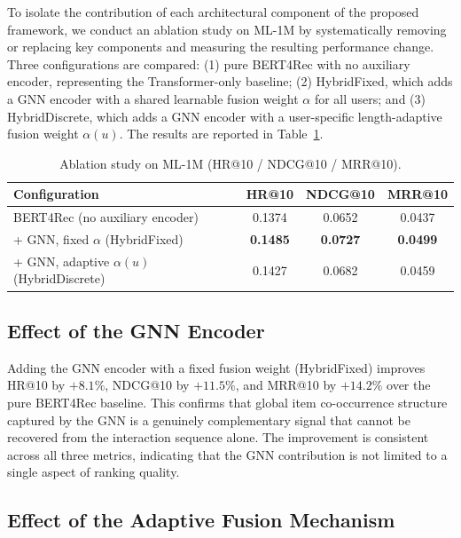 \documentclass[12pt,a4paper]{report}
\begin{document}
To isolate the contribution of each architectural component of the proposed
framework, we conduct an ablation study on ML-1M by systematically removing
or replacing key components and measuring the resulting performance change.
Three configurations are compared: (1) pure BERT4Rec with no auxiliary
encoder, representing the Transformer-only baseline; (2) HybridFixed, which
adds a GNN encoder with a shared learnable fusion weight \(\alpha\) for all
users; and (3) HybridDiscrete, which adds a GNN encoder with a user-specific
length-adaptive fusion weight \(\alpha(u)\). The results are reported in
Table~\ref{tab:ablation}.

\begin{table}[h]
\centering
\caption{Ablation study on ML-1M (HR@10 / NDCG@10 / MRR@10).}
\label{tab:ablation}
\begin{tabular}{p{6.5cm} ccc}
\toprule
\textbf{Configuration} & \textbf{HR@10} & \textbf{NDCG@10} & \textbf{MRR@10} \\
\midrule
BERT4Rec (no auxiliary encoder)      & 0.1374 & 0.0652 & 0.0437 \\
+ GNN, fixed \(\alpha\) (HybridFixed)           & \textbf{0.1485} & \textbf{0.0727} & \textbf{0.0499} \\
+ GNN, adaptive \(\alpha(u)\) (HybridDiscrete)  & 0.1427 & 0.0682 & 0.0459 \\
\bottomrule
\end{tabular}
\end{table}

\subsection*{Effect of the GNN Encoder}

Adding the GNN encoder with a fixed fusion weight (HybridFixed) improves
HR@10 by \(+8.1\%\), NDCG@10 by \(+11.5\%\), and MRR@10 by \(+14.2\%\)
over the pure BERT4Rec baseline. This confirms that global item co-occurrence
structure captured by the GNN is a genuinely complementary signal that cannot
be recovered from the interaction sequence alone. The improvement is consistent
across all three metrics, indicating that the GNN contribution is not limited
to a single aspect of ranking quality.

\subsection*{Effect of the Adaptive Fusion Mechanism}
\end{document}
